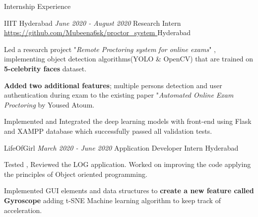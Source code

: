 \documentclass[8pt]{resume} %
\begin{document}
\begin{rSection}{Internship Experience}

    \begin{rSubsection}
        {IIIT Hyderabad}
        {\em June 2020 - August 2020}
        {Research Intern   \scriptsize \url{https://github.com/Mubeena6sk/proctor_system }} 
      {Hyderabad}
    \item Led a research project "\emph{Remote Proctoring system for online exams}" , implementing object detection algorithms(YOLO \& OpenCV) that are trained on {\bf 5-celebrity faces }dataset. 
    \item {\bf Added two additional features}; multiple persons detection and user authentication during exam to the existing paper "\emph{Automated Online Exam Proctoring} by Yoused Atoum. 
    \item Implemented and Integrated the deep learning models with front-end using Flask and XAMPP database which successfully passed all validation tests.
    \end{rSubsection}


    \begin{rSubsection}
        {LifeOfGirl}
        {\em March 2020 - June 2020}
        {Application Developer Intern}
        {Hyderabad}
    \item  Tested , Reviewed the LOG application. Worked on improving the code applying the principles of Object oriented programming.
    \item Implemented GUI elements and data structures to {\bf create a new feature called Gyroscope} adding t-SNE Machine learning algorithm to keep track of acceleration.
    \end{rSubsection}
%

\end{rSection}

\end{document}
